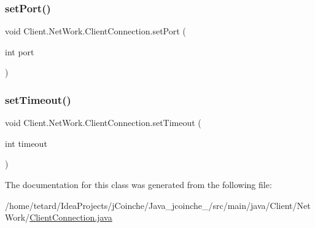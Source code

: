 \mbox{\label{classClient_1_1NetWork_1_1ClientConnection_abc5ca369107ad809258d23af01dcf959}} 
\subsubsection{\texorpdfstring{set\+Port()}{setPort()}}
{\footnotesize\ttfamily void Client.\+Net\+Work.\+Client\+Connection.\+set\+Port (\begin{DoxyParamCaption}\item[{int}]{port }\end{DoxyParamCaption})\hspace{0.3cm}{\ttfamily [inline]}}

\mbox{\label{classClient_1_1NetWork_1_1ClientConnection_ab8a2ea55eded25fb292ae13cef965100}} 
\subsubsection{\texorpdfstring{set\+Timeout()}{setTimeout()}}
{\footnotesize\ttfamily void Client.\+Net\+Work.\+Client\+Connection.\+set\+Timeout (\begin{DoxyParamCaption}\item[{int}]{timeout }\end{DoxyParamCaption})\hspace{0.3cm}{\ttfamily [inline]}}



The documentation for this class was generated from the following file\+:\begin{DoxyCompactItemize}
\item 
/home/tetard/\+Idea\+Projects/j\+Coinche/\+Java\+\_\+jcoinche\+\_/src/main/java/\+Client/\+Net\+Work/\mbox{\hyperlink{ClientConnection_8java}{Client\+Connection.\+java}}\end{DoxyCompactItemize}
